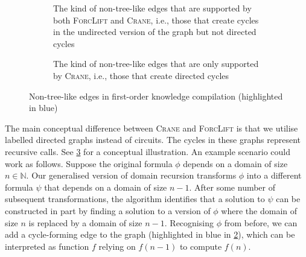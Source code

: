 \begin{figure}[t]
  \centering
  \begin{subfigure}{0.40\textwidth}
    \centering
    \caption{The kind of non-tree-like edges that are supported by both
      \textsc{ForcLift} and \textsc{Crane}, i.e., those that create cycles in
      the undirected version of the graph but not directed
      cycles}\label{fig:before}
  \end{subfigure}
  \hspace{0.08\textwidth}
  \begin{subfigure}{0.50\textwidth}
    \centering
    \caption{The kind of non-tree-like edges that are only supported by
      \textsc{Crane}, i.e., those that create directed cycles}\label{fig:after}
  \end{subfigure}
  \caption{Non-tree-like edges in first-order knowledge
    compilation (highlighted in blue)}\label{fig:intuition}
\end{figure}


The main conceptual difference between \textsc{Crane} and \textsc{ForcLift} is
that we utilise labelled directed graphs instead of circuits. The cycles in
these graphs represent recursive calls. See \cref{fig:intuition} for a
conceptual illustration. An example scenario could work as follows. Suppose the
original formula $\phi$ depends on a domain of size $n \in \mathbb{N}$. Our
generalised version of domain recursion transforms $\phi$ into a different
formula $\psi$ that depends on a domain of size $n-1$. After some number of
subsequent transformations, the algorithm identifies that a solution to $\psi$
can be constructed in part by finding a solution to a version of $\phi$ where
the domain of size $n$ is replaced by a domain of size $n-1$. Recognising $\phi$
from before, we can add a cycle-forming edge to the graph (highlighted in blue
in \cref{fig:after}), which can be interpreted as function $f$ relying on
$f(n-1)$ to compute $f(n)$.

